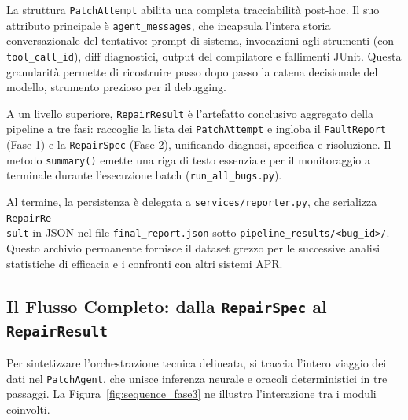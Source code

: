 La struttura \texttt{PatchAttempt} abilita una completa tracciabilità post-hoc. Il suo attributo principale è
\texttt{agent\_messages}, che incapsula l'intera storia conversazionale del tentativo: prompt di sistema,
invocazioni agli strumenti (con \texttt{tool\_call\_id}), diff diagnostici, output del compilatore e fallimenti
JUnit. Questa granularità permette di ricostruire passo dopo passo la catena decisionale del modello, strumento
prezioso per il debugging.

A un livello superiore, \texttt{RepairResult} è l'artefatto conclusivo aggregato della pipeline a tre fasi:
raccoglie la lista dei \texttt{PatchAttempt} e ingloba il \texttt{FaultReport} (Fase 1) e la \texttt{RepairSpec}
(Fase 2), unificando diagnosi, specifica e risoluzione. Il metodo \texttt{summary()} emette una riga di testo
essenziale per il monitoraggio a terminale durante l'esecuzione batch (\texttt{run\_all\_bugs.py}).

Al termine, la persistenza è delegata a \texttt{services/reporter.py}, che serializza \texttt{RepairRe\\sult} in JSON
nel file \texttt{final\_report.json} sotto \texttt{pipeline\_results/<bug\_id>/}. Questo archivio permanente fornisce
il dataset grezzo per le successive analisi statistiche di efficacia e i confronti con altri sistemi APR.

\subsection{Il Flusso Completo: dalla \texttt{RepairSpec} al \texttt{RepairResult}}
\label{subsec:3.4.9}
Per sintetizzare l'orchestrazione tecnica delineata, si traccia l'intero viaggio dei dati nel \texttt{PatchAgent},
che unisce inferenza neurale e oracoli deterministici in tre passaggi. La Figura~\ref{fig:sequence_fase3} ne
illustra l'interazione tra i moduli coinvolti.

